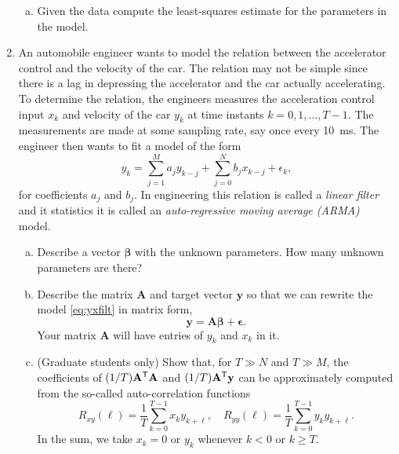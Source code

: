 \documentclass[11pt]{article}
\def\beq{\begin{equation}}
\def\eeq{\end{equation}}
\newcommand{\ybf}{\mathbf{y}}
\newcommand{\Abf}{\mathbf{A}}
\def\betabf{{\boldsymbol \beta}}
\def\epsilonbf{{\boldsymbol \epsilon}}
\newcommand{\tran}{^{\text{\sf T}}}
\begin{document}
\begin{enumerate}
\begin{center}
\begin{enumerate}[(a)]
\item Given the data compute the least-squares estimate for the parameters
in the model.
\end{enumerate}
\end{center}

\item An automobile engineer wants to model the relation
between the accelerator control and the velocity of the car.
The relation may not be simple since there is a lag in depressing
the accelerator and the car actually accelerating.  To determine
the relation, the engineers measures the acceleration control input $x_k$
and velocity of the car $y_k$ at time instants $k=0,1,\ldots,T-1$.
The measurements are made at some sampling rate, say once every 10~ms.
The engineer then wants to fit a model of the form
\beq \label{eq:yxfilt}
    y_k = \sum_{j=1}^M a_j y_{k-j} + \sum_{j=0}^N b_j x_{k-j} + \epsilon_k,
\eeq
for coefficients $a_j$ and $b_j$.
In engineering this relation is called a \emph{linear filter} and
it statistics it is called an \emph{auto-regressive moving average (ARMA)}
model.
\begin{enumerate}[(a)]
\item Describe a vector $\betabf$ with the unknown parameters.
How many unknown parameters are there?

\item Describe the matrix $\Abf$ and target vector $\ybf$ so that we can
rewrite the model \eqref{eq:yxfilt} in matrix form,
\[
    \ybf = \Abf \betabf + \epsilonbf.
\]
Your matrix $\Abf$ will have entries of $y_k$ and $x_k$ in it.

\item (Graduate students only)
Show that, for $T \gg N$ and $T \gg M$,
the coefficients of $(1/T)\Abf\tran\Abf$ and $(1/T)\Abf\tran\ybf$
can be approximately
computed from the so-called auto-correlation functions
\[
    R_{xy}(\ell) = \frac{1}{T} \sum_{k=0}^{T-1} x_ky_{k+\ell}, \quad
    R_{yy}(\ell) = \frac{1}{T} \sum_{k=0}^{T-1} y_ky_{k+\ell}.
\]
In the sum, we take $x_k=0$ or $y_k$ whenever $k < 0$ or $k \geq T$.

\end{enumerate}


\end{enumerate}
\end{document}
